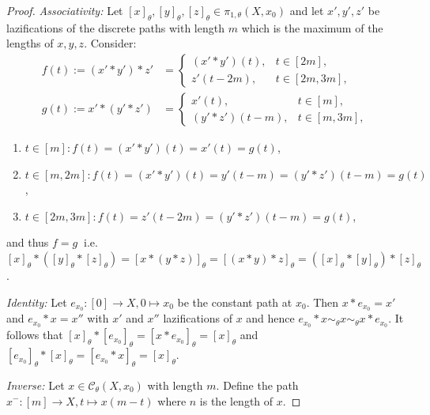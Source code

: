 \documentclass[a4paper, 11pt, twoside]{article}
\theoremstyle{break}
\theoremstyle{break}
\begin{document}
\begin{proof}
  \textit{Associativity:}
    Let $[x]_{\theta}, [y]_{\theta}, [z]_{\theta} \in \pi_{1,\theta}(X, x_0)$ 
    and let $x', y', z'$ be lazifications of the discrete paths with length $m$ which is the maximum of the lengths of $x,y,z$. Consider:
    \begin{align*}
      f(t) := (x' * y') * z' &= \begin{cases}
        (x' * y')(t), &t \in [2m], \\
        z'(t - 2m), &t \in [2m, 3m],
      \end{cases}\\
      g(t) := x' * (y' * z') &= \begin{cases}
        x'(t), &t \in [m], \\
        (y' * z')(t - m), &t \in [m, 3m],
      \end{cases}
    \end{align*}
  \begin{enumerate}
    \item $t \in [m]\colon f(t) = (x' * y')(t) = x'(t) = g(t)$,
    \item $t \in [m,2m]\colon f(t) = (x' * y')(t) = y'(t - m) = (y' * z')(t - m) = g(t)$,
    \item $t \in [2m,3m]\colon f(t) = z'(t - 2m) = (y' * z')(t - m) = g(t)$,
  \end{enumerate}
  and thus $f = g\:$ i.e. $[x]_{\theta} * ([y]_{\theta} * [z]_{\theta}) = [x * (y * z)]_{\theta} = [(x * y) * z]_{\theta} = ([x]_{\theta} * [y]_{\theta}) * [z]_{\theta}$.
  
  \textit{Identity:}
  Let $e_{x_0}\colon [0] \to X, 0 \mapsto x_0$ be the constant path at $x_0$. Then $x * e_{x_0} = x'$ and $e_{x_0} * x = x''$ with $x'$ and $x''$ lazifications of $x$ 
  and hence $e_{x_0} * x \sim_{\theta} x \sim_{\theta} x * e_{x_0}$.
  It follows that $[x]_{\theta} * [e_{x_0}]_{\theta} = [x * e_{x_0}]_{\theta} = [x]_{\theta}$ and $[e_{x_0}]_{\theta} * [x]_{\theta} = [e_{x_0} * x]_{\theta} = [x]_{\theta}$.
  
  \textit{Inverse:}
  Let $x \in \mathcal{C}_{\theta}(X, x_0)$ with length $m$. Define the path $x^-\colon [m] \to X, t \mapsto x(m - t)$ where $n$ is the length of $x$.


\end{proof}
\end{document}
